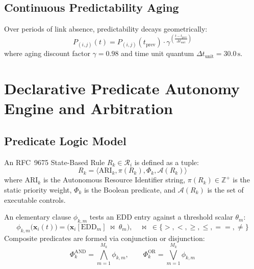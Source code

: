\documentclass[journal,compsoc]{IEEEtran}
\begin{document}
\subsection{Continuous Predictability Aging}
Over periods of link absence, predictability decays geometrically:
\begin{equation}
P_{(i, j)}(t) = P_{(i, j)}(t_{\mathrm{prev}}) \cdot \gamma^{\left(\frac{t - t_{\mathrm{prev}}}{\Delta t_{\mathrm{unit}}}\right)}
\label{eq:prophet_aging}
\end{equation}
where aging discount factor $\gamma = 0.98$ and time unit quantum $\Delta t_{\mathrm{unit}} = 30.0\,\mathrm{s}$.

\section{Declarative Predicate Autonomy Engine and Arbitration}

\subsection{Predicate Logic Model}
An RFC~9675 State-Based Rule $R_k \in \mathcal{R}_i$ is defined as a tuple:
\begin{equation}
R_k = \bigl\langle \mathrm{ARI}_k, \pi(R_k), \Phi_k, \mathcal{A}(R_k)\bigr\rangle
\end{equation}
where $\mathrm{ARI}_k$ is the Autonomous Resource Identifier string, $\pi(R_k) \in \mathbb{Z}^+$ is the static priority weight, $\Phi_k$ is the Boolean predicate, and $\mathcal{A}(R_k)$ is the set of executable controls.

An elementary clause $\phi_{k, m}$ tests an EDD entry against a threshold scalar $\theta_m$:
\begin{equation}
\phi_{k, m}\bigl(\mathbf{x}_i(t)\bigr) = \bigl(\mathbf{x}_i[\mathrm{EDD}_m] \;\bowtie\; \theta_m\bigr), \quad \bowtie \;\in \{>, <, \ge, \le, ==, \ne\}
\end{equation}
Composite predicates are formed via conjunction or disjunction:
\begin{equation}
\Phi_k^{\mathrm{AND}} = \bigwedge_{m=1}^{M_k} \phi_{k, m}, \qquad \Phi_k^{\mathrm{OR}} = \bigvee_{m=1}^{M_k} \phi_{k, m}
\end{equation}
\end{document}
